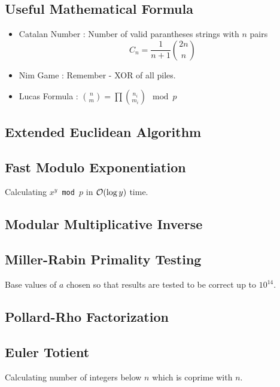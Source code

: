 \documentclass[landscape,8pt]{article}
\begin{document}
\begin{multicols}{2}
  \subsection{Useful Mathematical Formula}
    \begin{itemize}
      \item Catalan Number : Number of valid parantheses strings with $n$ pairs
      \[
        C_n = \frac{1}{n+1}\binom{2n}{n}
      \]
      \item Nim Game : Remember - XOR of all piles.
      \item Lucas Formula : $\binom{n}{m} = \prod \binom{n_i}{m_i} \mod p$
    \end{itemize}

  \subsection{Extended Euclidean Algorithm}
    

  \subsection{Fast Modulo Exponentiation}
  Calculating \texttt{$x^y$ mod $p$} in $\order{\log y}$ time.
    

  \subsection{Modular Multiplicative Inverse}
    

  \subsection{Miller-Rabin Primality Testing}
  Base values of $a$ chosen so that results are tested to be correct up to $10^14$.
    

  \subsection{Pollard-Rho Factorization}
    

  \subsection{Euler Totient}
  Calculating number of integers below $n$ which is coprime with $n$.
    



\end{multicols}
\end{document}
